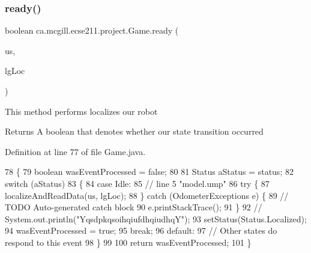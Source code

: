 \subsubsection{\texorpdfstring{ready()}{ready()}}
{\footnotesize\ttfamily boolean ca.\+mcgill.\+ecse211.\+project.\+Game.\+ready (\begin{DoxyParamCaption}\item[{\hyperlink{classca_1_1mcgill_1_1ecse211_1_1localization_1_1_ultrasonic_localizer}{Ultrasonic\+Localizer}}]{us,  }\item[{\hyperlink{classca_1_1mcgill_1_1ecse211_1_1localization_1_1_light_localizer}{Light\+Localizer}}]{lg\+Loc }\end{DoxyParamCaption})}

This method performs localizes our robot

\begin{DoxyReturn}{Returns}
A boolean that denotes whether our state transition occurred 
\end{DoxyReturn}


Definition at line 77 of file Game.\+java.


\begin{DoxyCode}
78   \{
79     \textcolor{keywordtype}{boolean} wasEventProcessed = \textcolor{keyword}{false};
80     
81     Status aStatus = status;
82     \textcolor{keywordflow}{switch} (aStatus)
83     \{
84       \textcolor{keywordflow}{case} Idle:
85         \textcolor{comment}{// line 5 "model.ump"}
86         \textcolor{keywordflow}{try} \{
87           localizeAndReadData(us, lgLoc);
88         \} \textcolor{keywordflow}{catch} (OdometerExceptions e) \{
89           \textcolor{comment}{// TODO Auto-generated catch block}
90           e.printStackTrace();
91         \}
92     \textcolor{comment}{//    System.out.println("YqsdpkqsoihqiufdhqiudhqY");}
93         setStatus(Status.Localized);
94         wasEventProcessed = \textcolor{keyword}{true};
95         \textcolor{keywordflow}{break};
96       \textcolor{keywordflow}{default}:
97         \textcolor{comment}{// Other states do respond to this event}
98     \}
99 
100     \textcolor{keywordflow}{return} wasEventProcessed;
101   \}
\end{DoxyCode}
\mbox{\label{enumca_1_1mcgill_1_1ecse211_1_1project_1_1_game_adf69abe44e952d627fb9e6a2f678cb5e}} 

